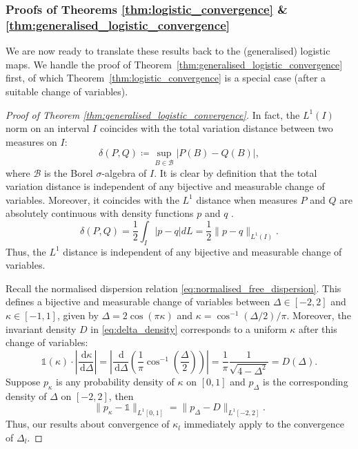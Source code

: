 \documentclass[a4paper]{article}
\theoremstyle{definition}
\numberwithin{equation}{section}
\numberwithin{theorem}{section}
\newcommand{\de}{\,\mathrm{d}}
\begin{document}
{\subsubsection{Proofs of Theorems \ref{thm:logistic_convergence} \& \ref{thm:generalised_logistic_convergence} }

We are now ready to translate these results back to the (generalised) logistic maps. We handle the proof of Theorem~\ref{thm:generalised_logistic_convergence} first, of which Theorem~\ref{thm:logistic_convergence} is a special case (after a suitable change of variables).

\begin{proof}[Proof of Theorem \ref{thm:generalised_logistic_convergence}]
    In fact, the $ L^1(I)$ norm on an interval $I$ coincides with the total variation distance between two measures on $I$:
    \begin{equation*}
        \delta(P,Q) \coloneq \sup_{B\in\mathcal{B}} |P(B)-Q(B)|,
    \end{equation*}
    where $\mathcal{B}$ is the Borel $\sigma$-algebra of $I$. It is clear by definition that the total variation distance is independent of any bijective and measurable change of variables. Moreover, it coincides with the $L^1$ distance when measures $P$ and $Q$ are absolutely continuous with density functions $p$ and $q$ \cite{tsybakov2009introduction}.
    \begin{equation*}
        \delta(P,Q) = \frac{1}{2}\int_I |p-q|dL=\frac{1}{2}\lVert p-q\rVert_{ L^1(I)}.
    \end{equation*}
    Thus, the $L^1$ distance is independent of any bijective and measurable change of variables.
    
    Recall the normalised dispersion relation \eqref{eq:normalised_free_dispersion}. This defines a bijective and measurable change of variables between $\Delta\in[-2,2]$ and $\kappa\in[-1,1]$, given by $\Delta=2\cos(\pi\kappa)$ and $\kappa = \cos^{-1}(\Delta/2)/\pi$. Moreover, the invariant density $D$ in \eqref{eq:delta_density} corresponds to a uniform $\kappa$ after this change of variables:
    \begin{equation*}
        \mathds{1}(\kappa)\cdot\left|\frac{\de\kappa}{\de\Delta}\right| = \left|\frac{\de}{\de\Delta}\left(\frac{1}{\pi}\cos^{-1}\left(\frac{\Delta}{2}\right)\right)\right| = \frac{1}{\pi}\frac{1}{\sqrt{4-\Delta^2}} = D(\Delta).
    \end{equation*}
    Suppose $p_{\kappa}$ is any probability density of $\kappa$ on $[0,1]$ and $p_{\Delta}$ is the corresponding density of $\Delta$ on $[-2,2]$, then
    \begin{equation*}
        \lVert p_{\kappa}-\mathds{1}\rVert_{ L^1[0,1]} = \lVert p_{\Delta}-D\rVert_{ L^1[-2,2]}.
    \end{equation*}
    Thus, our results about convergence of $\kappa_l$ immediately apply to the convergence of $\Delta_l$.


\end{proof}}
\end{document}
